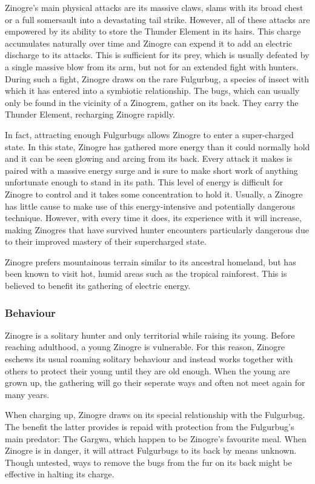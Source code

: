 Zinogre's main physical attacks are its massive claws, slams with its broad chest or a full somersault into a devastating tail strike. However, all of these attacks are empowered by its ability to store the Thunder Element in its hairs. This charge accumulates naturally over time and Zinogre can expend it to add an electric discharge to its attacks. This is sufficient for its prey, which is usually defeated by a single massive blow from its arm, but not for an extended fight with hunters. During such a fight, Zinogre draws on the rare Fulgurbug, a species of insect with which it has entered into a symbiotic relationship. The bugs, which can usually only be found in the vicinity of a Zinogrem, gather on its back. They carry the Thunder Element, recharging Zinogre rapidly.

In fact, attracting enough Fulgurbugs allows Zinogre to enter a super-charged state. In this state, Zinogre has gathered more energy than it could normally hold and it can be seen glowing and arcing from its back. Every attack it makes is paired with a massive energy surge and is sure to make short work of anything unfortunate enough to stand in its path. This level of energy is difficult for Zinogre to control and it takes some concentration to hold it. Usually, a Zinogre has little cause to make use of this energy-intensive and potentially dangerous technique. However, with every time it does, its experience with it will increase, making Zinogres that have survived hunter encounters particularly dangerous due to their improved mastery of their supercharged state.

Zinogre prefers mountainous terrain similar to its ancestral homeland, but has been known to visit hot, humid areas such as the tropical rainforest. This is believed to benefit its gathering of electric energy.

\subsubsection{Behaviour}
Zinogre is a solitary hunter and only territorial while raising its young. Before reaching adulthood, a young Zinogre is vulnerable. For this reason, Zinogre eschews its usual roaming solitary behaviour and instead works together with others to protect their young until they are old enough. When the young are grown up, the gathering will go their seperate ways and often not meet again for many years.

When charging up, Zinogre draws on its special relationship with the Fulgurbug. The benefit the latter provides is repaid with protection from the Fulgurbug's main predator: The Gargwa, which happen to be Zinogre's favourite meal. When Zinogre is in danger, it will attract Fulgurbugs to its back by means unknown. Though untested, ways to remove the bugs from the fur on its back might be effective in halting its charge.

